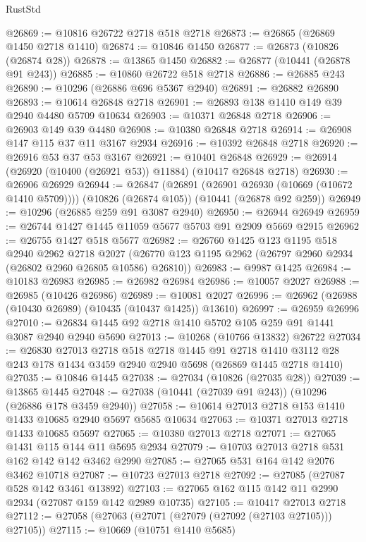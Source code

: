 \begin{lexlean}{RustStd}
\begin{coremodule}
@26869 := @10816 @26722 @2718 @518 @2718
@26873 := @26865 (@26869 @1450 @2718 @1410)
@26874 := @10846 @1450
@26877 := @26873 (@10826 (@26874 @28))
@26878 := @13865 @1450
@26882 := @26877 (@10441 (@26878 @91 @243))
@26885 := @10860 @26722 @518 @2718
@26886 := @26885 @243
@26890 := @10296 (@26886 @696 @5367 @2940)
@26891 := @26882 @26890
@26893 := @10614 @26848 @2718
@26901 := @26893 @138 @1410 @149 @39 @2940 @4480 @5709 @10634
@26903 := @10371 @26848 @2718
@26906 := @26903 @149 @39 @4480
@26908 := @10380 @26848 @2718
@26914 := @26908 @147 @115 @37 @11 @3167 @2934
@26916 := @10392 @26848 @2718
@26920 := @26916 @53 @37 @53 @3167
@26921 := @10401 @26848
@26929 := @26914 (@26920 (@10400 (@26921 @53)) @11884) (@10417 @26848 @2718)
@26930 := @26906 @26929
@26944 := @26847
    (@26891 (@26901 @26930 (@10669 (@10672 @1410 @5709))))
    (@10826 (@26874 @105))
    (@10441 (@26878 @92 @259))
@26949 := @10296 (@26885 @259 @91 @3087 @2940)
@26950 := @26944 @26949
@26959 := @26744 @1427 @1445 @11059 @5677 @5703 @91 @2909 @5669 @2915
@26962 := @26755 @1427 @518 @5677
@26982 := @26760
    @1425
    @123
    @1195
    @518
    @2940
    @2962
    @2718
    @2027
    (@26770 @123 @1195 @2962 (@26797 @2960 @2934 (@26802 @2960 @26805 @10586) @26810))
@26983 := @9987 @1425
@26984 := @10183 @26983
@26985 := @26982 @26984
@26986 := @10057 @2027
@26988 := @26985 (@10426 @26986)
@26989 := @10081 @2027
@26996 := @26962 (@26988 (@10430 @26989) (@10435 (@10437 @1425)) @13610)
@26997 := @26959 @26996
@27010 := @26834 @1445 @92 @2718 @1410 @5702 @105 @259 @91 @1441 @3087 @2940 @2940 @5690
@27013 := @10268 (@10766 @13832) @26722
@27034 := @26830
    @27013
    @2718
    @518
    @2718
    @1445
    @91
    @2718
    @1410
    @3112
    @28
    @243
    @178
    @1434
    @3459
    @2940
    @2940
    @5698
    (@26869 @1445 @2718 @1410)
@27035 := @10846 @1445
@27038 := @27034 (@10826 (@27035 @28))
@27039 := @13865 @1445
@27048 := @27038 (@10441 (@27039 @91 @243)) (@10296 (@26886 @178 @3459 @2940))
@27058 := @10614 @27013 @2718 @153 @1410 @1433 @10685 @2940 @5697 @5685 @10634
@27063 := @10371 @27013 @2718 @1433 @10685 @5697
@27065 := @10380 @27013 @2718
@27071 := @27065 @1431 @115 @144 @11 @5695 @2934
@27079 := @10703 @27013 @2718 @531 @162 @142 @142 @3462 @2990
@27085 := @27065 @531 @164 @142 @2076 @3462 @10718
@27087 := @10723 @27013 @2718
@27092 := @27085 (@27087 @528 @142 @3461 @13892)
@27103 := @27065 @162 @115 @142 @11 @2990 @2934 (@27087 @159 @142 @2989 @10735)
@27105 := @10417 @27013 @2718
@27112 := @27058 (@27063 (@27071 (@27079 (@27092 (@27103 @27105))) @27105))
@27115 := @10669 (@10751 @1410 @5685)

\end{coremodule}
\end{lexlean}
